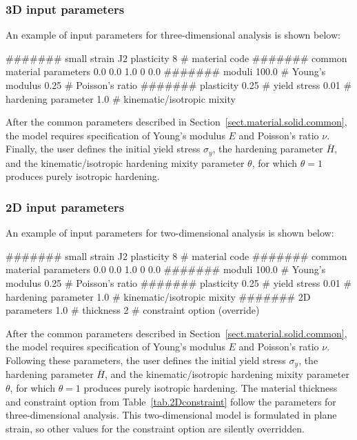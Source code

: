 \subsubsection{3D input parameters}
An example of input parameters for three-dimensional analysis is shown 
below:
\begin{inputfile}
####### small strain J2 plasticity
8     # material code
####### common material parameters
0.0    0.0    1.0
0      0.0
####### moduli
100.0 # Young's modulus
0.25  # Poisson's ratio
####### plasticity
0.25  # yield stress
0.01  # hardening parameter
1.0   # kinematic/isotropic mixity
\end{inputfile}
After the common parameters described in 
Section~\ref{sect.material.solid.common}, the 
model requires specification of Young's modulus 
$E$ and Poisson's ratio $\nu$. Finally, the user defines the initial 
yield stress $\sigma_{y}$, the hardening parameter $\bar{H}$, and the 
kinematic/isotropic hardening mixity parameter $\theta$, 
for which $\theta = 1$ produces purely isotropic hardening.

\subsubsection{2D input parameters}
An example of input parameters for two-dimensional analysis is shown 
below:
\begin{inputfile}
####### small strain J2 plasticity
8     # material code
####### common material parameters
0.0    0.0    1.0
0      0.0
####### moduli
100.0 # Young's modulus
0.25  # Poisson's ratio
####### plasticity
0.25  # yield stress
0.01  # hardening parameter
1.0   # kinematic/isotropic mixity
####### 2D parameters
1.0   # thickness
2     # constraint option (override)
\end{inputfile}
After the common parameters described in 
Section~\ref{sect.material.solid.common}, the 
model requires specification of Young's modulus 
$E$ and Poisson's ratio $\nu$. Following these parameters, 
the user defines the initial 
yield stress $\sigma_{y}$, the hardening parameter $\bar{H}$, and the 
kinematic/isotropic hardening mixity parameter $\theta$, 
for which $\theta = 1$ produces purely isotropic hardening.
The material thickness and 
constraint option from Table~\ref{tab.2Dconstraint} 
follow the parameters for three-dimensional analysis.
This two-dimensional model is formulated in plane strain,
so other values for the constraint option are silently
overridden.

